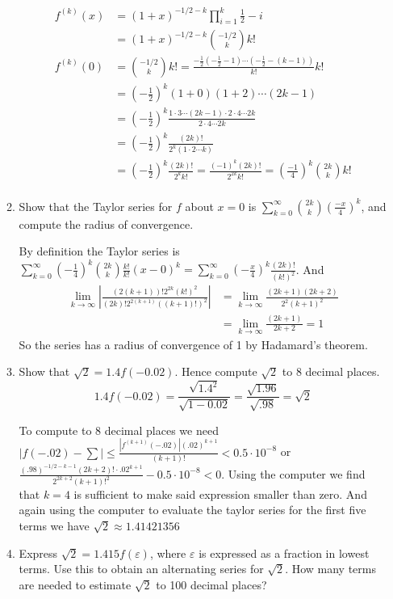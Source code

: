 \documentclass[letterpaper]{article}
\begin{document}
\begin{enumerate}
\begin{enumerate}
  \begin{align*}
    f^{(k)}(x)&=(1+x)^{-1/2-k}\prod\limits_{i=1}^k{\frac{1}{2}-i}\\
    &=(1+x)^{-1/2-k}\binom{-1/2}{k}k!\\
    f^{(k)}(0)&=\binom{-1/2}{k}k!=\frac{-\frac{1}{2}\left(-\frac{1}{2}-1\right)\cdots\left(-\frac{1}{2}-(k-1)\right)}{k!}k!\\
    &=\left(-\frac{1}{2}\right)^k(1+0)\left(1+2\right)\cdots\left(2k-1\right)\\
    &=\left(-\frac{1}{2}\right)^k\frac{1\cdot3\cdots\left(2k-1\right)\cdot2\cdot4\cdots2k}{2\cdot4\cdots2k}\\
    &=\left(-\frac{1}{2}\right)^k\frac{(2k)!}{2^k(1\cdot2\cdots k)}\\
    &=\left(-\frac{1}{2}\right)^k\frac{(2k)!}{2^kk!}
    =\frac{(-1)^k(2k)!}{2^{2k}k!}=\left(\frac{-1}{4}\right)^k\binom{2k}{k}k!\\
  \end{align*}
  \item
  Show that the Taylor series for $f$ about $x=0$ is $\sum\limits_{k=0}^\infty{{2k\choose k}\left(\frac{-x}{4}\right)^k}$, and compute the radius of convergence.

  By definition the Taylor series is $\sum\limits_{k=0}^\infty{\left(-\frac{1}{4}\right)^k{2k\choose k}\frac{k!}{k!}(x-0)^k}=\sum\limits_{k=0}^\infty{\left(-\frac{x}{4}\right)^k\frac{(2k)!}{(k!)^2}}$. And
  \begin{align*}
    \lim\limits_{k\to\infty}\left\lvert\frac{(2(k+1))!2^{2k}(k!)^2}{(2k)!2^{2(k+1)}((k+1)!)^2}\right\rvert
    &=\lim\limits_{k\to\infty}\frac{(2k+1)(2k+2)}{2^2(k+1)^2}\\
    &=\lim\limits_{k\to\infty}\frac{(2k+1)}{2k+2}=1
  \end{align*}
  So the series has a radius of convergence of 1 by Hadamard's theorem.
  \item
  Show that $\sqrt{2}=1.4f(-0.02)$.
  Hence compute $\sqrt{2}$ to $8$ decimal places.
  \[1.4f(-0.02)=\frac{\sqrt{1.4^2}}{\sqrt{1-0.02}}=\frac{\sqrt{1.96}}{\sqrt{.98}}=\sqrt{2}\]

  To compute to 8 decimal places we need $\displaystyle |f(-.02)-\sum|\le \frac{|f^{(k+1)}(-.02)|(.02)^{k+1}}{(k+1)!}<0.5\cdot10^{-8}$ or $\displaystyle \frac{(.98)^{-1/2-k-1}(2k+2)!\cdot.02^{k+1}}{2^{2k+2}(k+1)!^2}-0.5\cdot 10^{-8}<0$. Using the computer we find that $k=4$ is sufficient to make said expression smaller than zero. And again using the computer to evaluate the taylor series for the first five terms we have $\sqrt{2}\approx1.41421356$
  \item
  Express $\sqrt{2}=1.415f(\varepsilon)$, where $\varepsilon$ is expressed as a fraction in lowest terms. Use this to obtain an alternating series for $\sqrt{2}$. How many terms are needed to estimate $\sqrt{2}$ to 100 decimal places?


\end{enumerate}
\end{enumerate}
\end{document}
